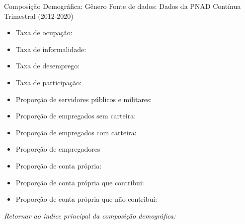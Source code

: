 \begin{frame}[label=_composicao_demografica_genero]{Composição Demográfica: Gênero}
{\footnotesize Fonte de dados: Dados da PNAD Contínua Trimestral (2012-2020)}
\begin{itemize}
\item{Taxa de ocupação: \hyperlink{_composicao_demografica_genero_taxa_de_ocupacao}{}}
\item{Taxa de informalidade: \hyperlink{_composicao_demografica_genero_taxa_de_informalidade}{}}
\item{Taxa de desemprego: \hyperlink{_composicao_demografica_genero_taxa_de_desemprego}{}}
\item{Taxa de participação: \hyperlink{_composicao_demografica_genero_taxa_de_participacao}{}}
\item{Proporção de servidores públicos e militares: \hyperlink{_composicao_demografica_genero_prop_militar}{}}
\item{Proporção de empregados sem carteira: \hyperlink{_composicao_demografica_genero_prop_empregadoSC}{}}
\item{Proporção de empregados com carteira: \hyperlink{_composicao_demografica_genero_prop_empregadoCC}{}}
\item{Proporção de empregadores \hyperlink{_composicao_demografica_genero_prop_empregador}{}}
\item{Proporção de conta própria: \hyperlink{_composicao_demografica_genero_prop_cpropria}{}}
\item{Proporção de conta própria que contribui: \hyperlink{_composicao_demografica_genero_prop_cpropriaC}{}}
\item{Proporção de conta própria que não contribui: \hyperlink{_composicao_demografica_genero_prop_cpropriaNc}{}}
\end{itemize}

\begin{small}
\textit{Retornar ao índice principal da composição demográfica: \hyperlink{_composicao_demografica}{} }
\end{small}

\end{frame}

